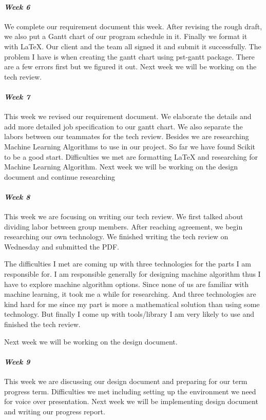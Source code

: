 \documentclass[onecolumn, draftclsnofoot,10pt, compsoc]{IEEEtran}
\begin{document}
\paragraph{\emph{Week 6}}
We complete our requirement document this week. After revising the rough draft, we also put a Gantt chart of our program schedule in it. Finally we format it with LaTeX. Our client and the team all signed it and submit it successfully. The problem I have is when creating the gantt chart using pst-gantt package. There are a few errors first but we figured it out. Next week we will be working on the tech review.
\paragraph{\emph{Week 7}}
This week we revised our requirement document. We elaborate the details and add more detailed job specification to our gantt chart. We also separate the labors between our teammates for the tech review. Besides we are researching Machine Learning Algorithms to use in our project. So far we have found Scikit to be a good start. Difficulties we met are formatting LaTeX and researching for Machine Learning Algorithm. Next week we will be working on the design document and continue researching
\paragraph{\emph{Week 8}}
This week we are focusing on writing our tech review. We first talked about dividing labor between group members. After reaching agreement, we begin researching our own technology. We finished writing the tech review on Wednesday and submitted the PDF.

The difficulties I met are coming up with three technologies for the parts I am responsible for. I am responsible generally for designing machine algorithm thus I have to explore machine algorithm options. Since none of us are familiar with machine learning, it took me a while for researching. And three technologies are kind hard for me since my part is more a mathematical solution than using some technology. But finally I come up with tools/library I am very likely to use and finished the tech review.

Next week we will be working on the design document.
\paragraph{\emph{Week 9}}
This week we are discussing our design document and preparing for our term progress term. Difficulties we met including setting up the environment we need for voice over presentation. Next week we will be implementing design document and writing our progress report.
\end{document}
